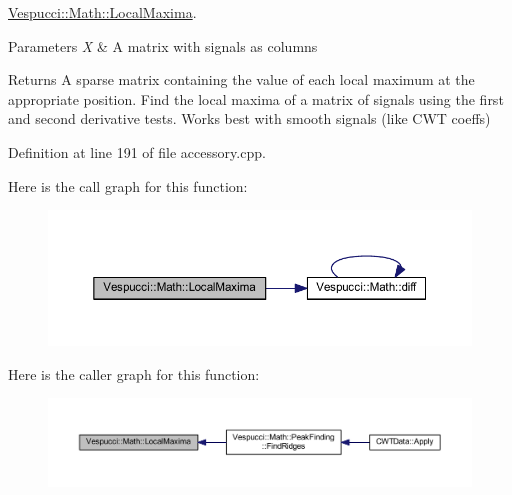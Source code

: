 \hyperlink{namespace_vespucci_1_1_math_a0ae415aafa638d49a2ee5b2816bdf7ec}{Vespucci\+::\+Math\+::\+Local\+Maxima}. 


\begin{DoxyParams}{Parameters}
{\em X} & A matrix with signals as columns \\
\hline
\end{DoxyParams}
\begin{DoxyReturn}{Returns}
A sparse matrix containing the value of each local maximum at the appropriate position. Find the local maxima of a matrix of signals using the first and second derivative tests. Works best with smooth signals (like C\+W\+T coeffs) 
\end{DoxyReturn}


Definition at line 191 of file accessory.\+cpp.



Here is the call graph for this function\+:
\nopagebreak
\begin{figure}[H]
\begin{center}
\leavevmode
\includegraphics[width=350pt]{namespace_vespucci_1_1_math_a0ae415aafa638d49a2ee5b2816bdf7ec_cgraph}
\end{center}
\end{figure}




Here is the caller graph for this function\+:
\nopagebreak
\begin{figure}[H]
\begin{center}
\leavevmode
\includegraphics[width=350pt]{namespace_vespucci_1_1_math_a0ae415aafa638d49a2ee5b2816bdf7ec_icgraph}
\end{center}
\end{figure}


